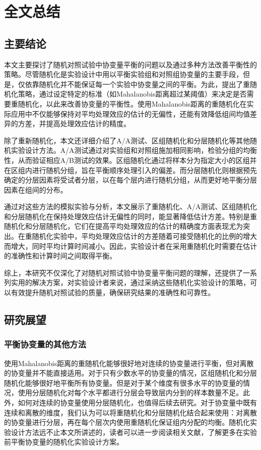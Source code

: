 
\chapter{全文总结}


\section{主要结论}

本文主要探讨了随机对照试验中协变量平衡的问题以及通过多种方法改善平衡性的策略。尽管随机化是实验设计中用以平衡实验组和对照组协变量的主要手段，但是，仅依靠随机化并不能保证每一个实验中协变量之间的平衡。为此，提出了重随机化策略，通过设定特定的标准（如Mahalanobis距离超过某阈值）来决定是否需要重随机化，以此来改善协变量的平衡性。使用Mahalanobis距离的重随机化在实际应用中不仅能够保持对平均处理效应的估计的无偏性，还能有效降低组间均值差异的方差，并提高处理效应估计的精度。

除了重新随机化，本文还详细介绍了A/A测试、区组随机化和分层随机化等其他随机实验设计方法。A/A测试通过对实验组和对照组施加相同影响，检验分组的均衡性，从而验证相应A/B测试的效果。区组随机化通过将样本分为指定大小的区组并在区组内进行随机分组，旨在平衡顺序处理引入的偏差。而分层随机化则根据预先确定的分层因素将受试者分层，以在每个层内进行随机分组，从而更好地平衡分层因素在组间的分布。

通过对这些方法的模拟实验与分析，本文展示了重随机化、A/A测试、区组随机化和分层随机化在保持处理效应估计无偏性的同时，能显著降低估计方差。特别是重随机化和分层随机化，它们在提高平均处理效应的估计的精确度方面表现尤为突出。在重随机化实验中，平均处理效应估计的方差随着可接受随机化的比例的增大而增大，同时平均计算时间减小。因此，实验设计者在采用重随机化时需要在估计的准确性和计算时间之间取得平衡。

综上，本研究不仅深化了对随机对照试验中协变量平衡问题的理解，还提供了一系列实用的解决方案，对实验设计者来说，通过采纳这些随机化实验设计的策略，可以有效提升随机对照试验的质量，确保研究结果的准确性和可靠性。

\section{研究展望}
\subsection{平衡协变量的其他方法}
    使用Mahalanobis距离的重随机化能够很好地对连续的协变量进行平衡，但对离散的协变量并不能直接适用。对于只有少数水平的协变量的情况，区组随机化和分层随机化能够很好地平衡所有协变量。但是对于某个维度有很多水平的协变量的情况，使用分层随机化对每个水平都进行分层会导致层内分到的样本数量不足。此外，如何对连续的协变量使用分层随机化，也值得后续去研究。对于协变量中既有连续和离散的维度，我们认为可以将重随机化和分层随机化结合起来使用：对离散的协变量进行分层，再在每个层次内使用重随机化保证组内分配的均衡。随机化实验设计方法远不止本文所讲述的，读者可以进一步阅读相关文献，了解更多在实验前平衡协变量的随机化实验设计方案。

